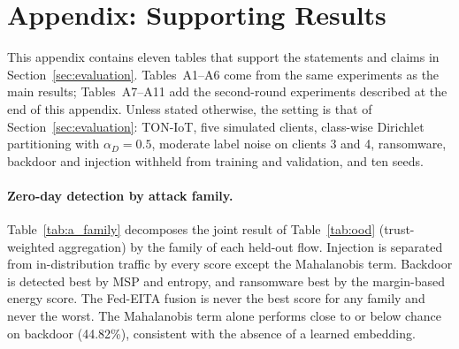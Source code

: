 \documentclass[pdflatex,sn-mathphys-num]{sn-jnl}
\newcommand{\Rtwo}{\color{blue}}
\begin{document}
{{{{{\color{black}
\section*{Appendix: Supporting Results}\label{app:supporting}
\setcounter{table}{0}
\renewcommand{\thetable}{A\arabic{table}}
{\Rtwo This appendix contains eleven tables that support the statements and claims in Section~\ref{sec:evaluation}. Tables~A1--A6 come from the same experiments as the main results; Tables~A7--A11 add the second-round experiments described at the end of this appendix.} Unless stated otherwise, the setting is that of Section~\ref{sec:evaluation}: TON-IoT, five simulated clients, class-wise Dirichlet partitioning with $\alpha_D=0.5$, moderate label noise on clients 3 and 4, ransomware, backdoor and injection withheld from training and validation, and ten seeds.

\paragraph{Zero-day detection by attack family.} Table~\ref{tab:a_family} decomposes the joint result of Table~\ref{tab:ood} (trust-weighted aggregation) by the family of each held-out flow. Injection is separated from in-distribution traffic by every score except the Mahalanobis term. Backdoor is detected best by MSP and entropy, and ransomware best by the margin-based energy score. The Fed-EITA fusion is never the best score for any family and never the worst. The Mahalanobis term alone performs close to or below chance on backdoor (44.82\%), consistent with the absence of a learned embedding.

\begin{table}[!htbp]\centering
\caption{Zero-day detection per held-out family, three families withheld jointly (AUROC and FPR@95, \%; mean over ten seeds).}\label{tab:a_family}
\footnotesize
\setlength{\tabcolsep}{4pt}
\end{table}

}}}}}
\end{document}
